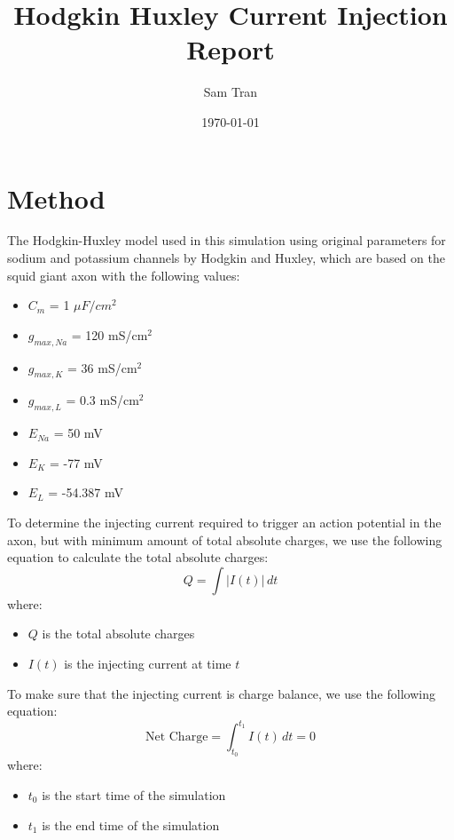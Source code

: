 \documentclass[letterpaper,12pt]{article}
\title{Hodgkin Huxley Current Injection Report}
\author{Sam Tran}
\date{\today}
\begin{document}
\maketitle
\section*{Method}



\noindent The Hodgkin-Huxley model used in this simulation using original parameters for sodium and potassium channels by Hodgkin and Huxley, which are based on the squid giant axon with the following values:
\begin{multicols}{2}
    \begin{itemize}
        \item $C_m$ = 1 $\mu F/cm^2$
        \item $g_{max,Na}$ = 120 mS/cm$^2$
        \item $g_{max,K}$ = 36 mS/cm$^2$
        \item $g_{max,L}$ = 0.3 mS/cm$^2$
        \item $E_{Na}$ = 50 mV
        \item $E_{K}$ = -77 mV
        \item $E_{L}$ = -54.387 mV
    \end{itemize}  
\end{multicols}

\noindent To determine the injecting current required to trigger an action potential in the axon, but with minimum amount of total absolute charges, we use the following equation to calculate the total absolute charges:
\begin{equation}
    Q = \int |I(t)|\, dt
\end{equation}
where:
\begin{multicols}{2}
    \begin{itemize}
        \item $Q$ is the total absolute charges
        \item $I(t)$ is the injecting current at time $t$
    \end{itemize}
\end{multicols}
\noindent To make sure that the injecting current is charge balance, we use the following equation:
\begin{equation}
    \text{Net Charge} = \int_{t_0}^{t_1} I(t)\, dt = 0
\end{equation}
where:
\begin{multicols}{2}
    \begin{itemize}
        \item $t_0$ is the start time of the simulation
        \item $t_1$ is the end time of the simulation
    \end{itemize}
\end{multicols}
\end{document}
